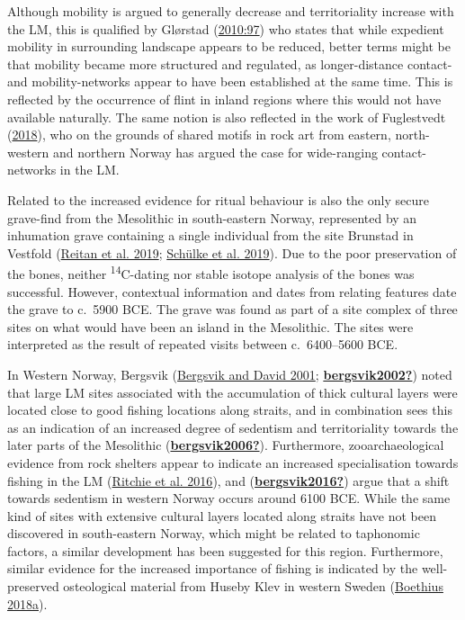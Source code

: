 \documentclass[
  12pt,
  a4paper,
  oneside]{book}
\begin{document}
Although mobility is argued to generally decrease and territoriality increase with the LM, this is qualified by Glørstad (\protect\hyperlink{ref-glorstad2010}{2010:97}) who states that while expedient mobility in surrounding landscape appears to be reduced, better terms might be that mobility became more structured and regulated, as longer-distance contact- and mobility-networks appear to have been established at the same time. This is reflected by the occurrence of flint in inland regions where this would not have available naturally. The same notion is also reflected in the work of Fuglestvedt (\protect\hyperlink{ref-fuglestvedt2018}{2018}), who on the grounds of shared motifs in rock art from eastern, north-western and northern Norway has argued the case for wide-ranging contact-networks in the LM.

Related to the increased evidence for ritual behaviour is also the only secure grave-find from the Mesolithic in south-eastern Norway, represented by an inhumation grave containing a single individual from the site Brunstad in Vestfold (\protect\hyperlink{ref-reitan2019}{Reitan et al. 2019}; \protect\hyperlink{ref-schulke2019}{Schülke et al. 2019}). Due to the poor preservation of the bones, neither \textsuperscript{14}C-dating nor stable isotope analysis of the bones was successful. However, contextual information and dates from relating features date the grave to c.~5900 BCE. The grave was found as part of a site complex of three sites on what would have been an island in the Mesolithic. The sites were interpreted as the result of repeated visits between c.~6400--5600 BCE.

In Western Norway, Bergsvik (\protect\hyperlink{ref-bergsvik2001}{Bergsvik and David 2001}; \protect\hyperlink{ref-bergsvik2002}{\textbf{bergsvik2002?}}) noted that large LM sites associated with the accumulation of thick cultural layers were located close to good fishing locations along straits, and in combination sees this as an indication of an increased degree of sedentism and territoriality towards the later parts of the Mesolithic (\protect\hyperlink{ref-bergsvik2006}{\textbf{bergsvik2006?}}). Furthermore, zooarchaeological evidence from rock shelters appear to indicate an increased specialisation towards fishing in the LM (\protect\hyperlink{ref-ritchie2016}{Ritchie et al. 2016}), and (\protect\hyperlink{ref-bergsvik2016}{\textbf{bergsvik2016?}}) argue that a shift towards sedentism in western Norway occurs around 6100 BCE. While the same kind of sites with extensive cultural layers located along straits have not been discovered in south-eastern Norway, which might be related to taphonomic factors, a similar development has been suggested for this region. Furthermore, similar evidence for the increased importance of fishing is indicated by the well-preserved osteological material from Huseby Klev in western Sweden (\protect\hyperlink{ref-boethius2018}{Boethius 2018a}).
\end{document}
